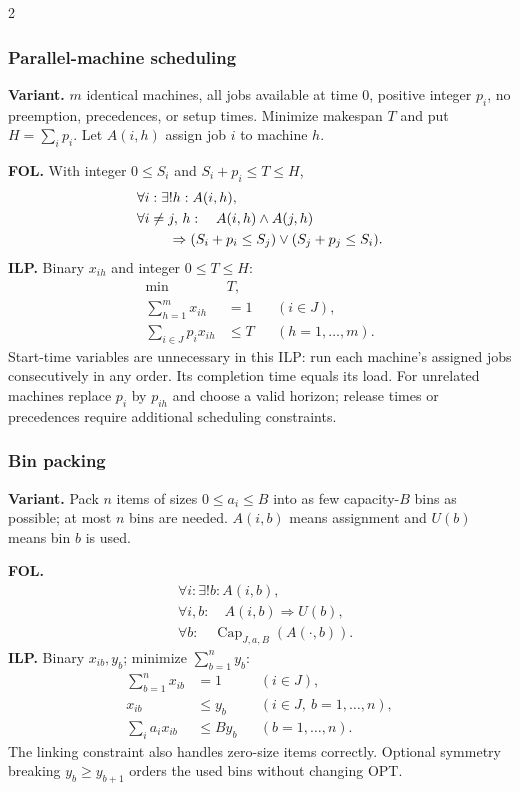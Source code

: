 \documentclass[8pt]{extarticle}
\theoremstyle{definition}
\begin{document}
\begin{multicols*}{2}
\subsubsection{Parallel-machine scheduling}\label{form:parallel}
\textbf{Variant.} $m$ identical machines, all jobs available at time 0,
positive integer $p_i$, no preemption, precedences, or setup times.
Minimize makespan $T$ and put $H=\sum_i p_i$. Let $A(i,h)$ assign job $i$
to machine $h$.

\textbf{FOL.} With integer $0\le S_i$ and $S_i+p_i\le T\le H$,
\[
\begin{aligned}
 &\forall i:\exists!h:A(i,h),\\
 &\forall i\ne j,\,h:\quad A(i,h)\land A(j,h)\\
 &\hspace{8mm}\Rightarrow
 (S_i+p_i\le S_j)\lor(S_j+p_j\le S_i).
\end{aligned}
\]
\textbf{ILP.} Binary $x_{ih}$ and integer $0\le T\le H$:
\[
\begin{aligned}
 \min\quad &T,\\
 \sum_{h=1}^m x_{ih}&=1 &&(i\in J),\\
 \sum_{i\in J}p_ix_{ih}&\le T &&(h=1,\ldots,m).
\end{aligned}
\]
Start-time variables are unnecessary in this ILP: run each machine's assigned
jobs consecutively in any order. Its completion time equals its load.
For unrelated machines replace $p_i$ by $p_{ih}$ and choose a valid horizon;
release times or precedences require additional scheduling constraints.

\subsubsection{Bin packing}\label{form:bin}
\textbf{Variant.} Pack $n$ items of sizes $0\le a_i\le B$ into as few
capacity-$B$ bins as possible; at most $n$ bins are needed. $A(i,b)$ means
assignment and $U(b)$ means bin $b$ is used.

\textbf{FOL.}
\[
\begin{aligned}
 &\forall i:\exists!b:A(i,b),\\
 &\forall i,b:\quad A(i,b)\Rightarrow U(b),\\
 &\forall b:\quad\operatorname{Cap}_{J,a,B}(A(\cdot,b)).
\end{aligned}
\]
\textbf{ILP.} Binary $x_{ib},y_b$; minimize $\sum_{b=1}^n y_b$:
\[
\begin{aligned}
 \sum_{b=1}^n x_{ib}&=1 &&(i\in J),\\
 x_{ib}&\le y_b &&(i\in J,\ b=1,\ldots,n),\\
 \sum_i a_ix_{ib}&\le By_b &&(b=1,\ldots,n).
\end{aligned}
\]
The linking constraint also handles zero-size items correctly. Optional
symmetry breaking $y_b\ge y_{b+1}$ orders the used bins without changing OPT.


\end{multicols*}
\end{document}
